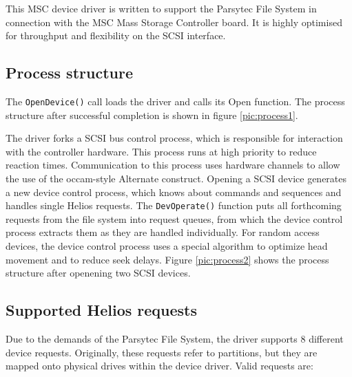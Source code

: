 This MSC device driver is written to support the Parsytec File System in
connection with the MSC Mass Storage Controller board. It is highly optimised
for throughput and flexibility on the SCSI interface.

\subsection{Process structure}
The {\tt OpenDevice()} call loads the driver and calls its Open function.
The process structure after successful completion is shown in figure
\ref{pic:process1}.


The driver forks a SCSI bus control process, which is responsible for
interaction with the controller hardware. This process runs at high priority
to reduce reaction times. Communication to this process uses hardware
channels to allow the use of the occam-style Alternate construct.
Opening a SCSI device generates a new device control process, which knows
about commands and sequences and handles single Helios requests. The
{\tt DevOperate()} function puts all forthcoming requests from the file system
into request queues, from which the device control process extracts them as 
they are handled individually. For random access devices, the device control
process uses a special algorithm to optimize head movement and to reduce seek
delays. Figure \ref{pic:process2} shows the process structure after openening
two SCSI devices.

\subsection{Supported Helios requests}

Due to the demands of the Parsytec File System, the driver supports 8
different device requests. Originally, these requests refer to partitions,
but they are mapped onto physical drives within the device driver. Valid
requests are:

